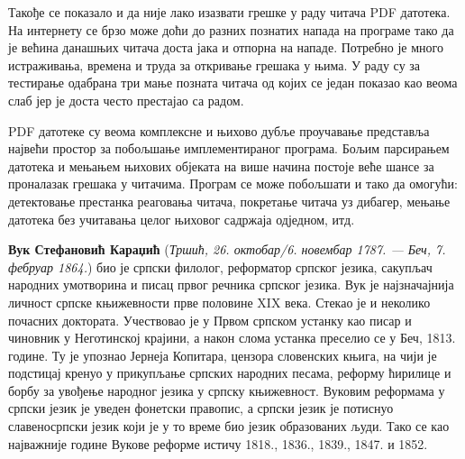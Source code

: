 \documentclass[12pt,oneside]{memoir}
\begin{document}
Такође се показало и да није лако изазвати грешке у раду читача PDF датотека. На интернету се брзо може доћи до разних познатих напада на програме тако да је већина данашњих читача доста јака и отпорна на нападе. Потребно је много истраживања, времена и труда за откривање грешака у њима. У раду су за тестирање одабрана три мање позната читача од којих се један показао као веома слаб јер је доста често престајао са радом. 

PDF датотеке су веома комплексне и њихово дубље проучавање представља највећи простор за побољшање имплементираног програма. Бољим парсирањем датотека и мењањем њихових објеката на више начина постоје веће шансе за проналазак грешака у читачима. Програм се може побољшати и тако да омогући: детектовање престанка реаговања читача, покретање читача уз дибагер, мењање датотека без учитавања целог њиховог садржаја одједном, итд. 


\literatura

\backmatter

\begin{biografija}
\textbf{Вук Стефановић Караџић} (\emph{Тршић, 26. октобар/6. новембар
  1787. — Беч, 7. фебруар 1864.}) био је српски филолог, реформатор
српског језика, сакупљач народних умотворина и писац првог речника
српског језика.  Вук је најзначајнија личност српске књижевности прве
половине XIX века. Стекао је и неколико почасних доктората.
Учествовао је у Првом српском устанку као писар и чиновник у
Неготинској крајини, а након слома устанка преселио се у Беч,
1813. године. Ту је упознао Јернеја Копитара, цензора словенских
књига, на чији је подстицај кренуо у прикупљање српских народних
песама, реформу ћирилице и борбу за увођење народног језика у српску
књижевност. Вуковим реформама у српски језик је уведен фонетски
правопис, а српски језик је потиснуо славеносрпски језик који је у то
време био језик образованих људи. Тако се као најважније године Вукове
реформе истичу 1818., 1836., 1839., 1847. и 1852.
\end{biografija}
\end{document}
